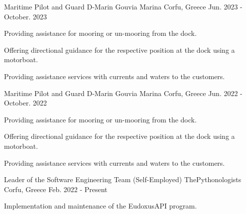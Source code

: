 

\begin{cventries}


  \cventry
    {Maritime Pilot and Guard} %
    {D-Marin Gouvia Marina} %
    {Corfu, Greece} %
    {Jun. 2023 - October. 2023} %
    {
      \begin{cvitems} %
        \item {Providing assistance for mooring or un-mooring from the dock.}
        \item {Offering directional guidance for the respective position at the dock using a motorboat.}
        \item {Providing assistance services with currents and waters to the customers.}
      \end{cvitems}
    }

  \cventry
    {Maritime Pilot and Guard} %
    {D-Marin Gouvia Marina} %
    {Corfu, Greece} %
    {Jun. 2022 - October. 2022} %
    {
      \begin{cvitems} %
        \item {Providing assistance for mooring or un-mooring from the dock.}
        \item {Offering directional guidance for the respective position at the dock using a motorboat.}
        \item {Providing assistance services with currents and waters to the customers.}
      \end{cvitems}
    }
    
  \cventry
    {Leader of the Software Engineering Team (Self-Employed)} %
    {ThePythonologists} %
    {Corfu, Greece} %
    {Feb. 2022 - Present} %
    {
      \begin{cvitems} %
        \item {Implementation and maintenance of the EudoxusAPI program.}
      \end{cvitems}
    }
    

\end{cventries}
